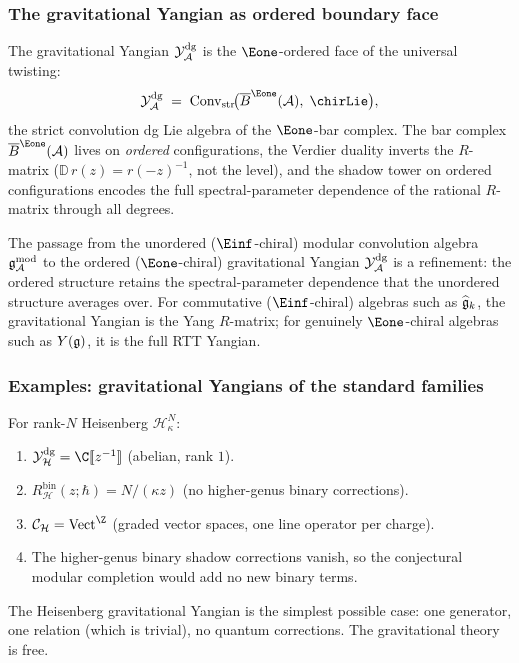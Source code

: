 \subsubsection{The gravitational Yangian as ordered boundary face}

\begin{remark}
\label{rem:thqg-V-ordered-face}
The gravitational Yangian $\mathcal{Y}^{\mathrm{dg}}_{\mathcal{A}}$ is the $\Eone$-ordered face of
the universal twisting:
\begin{equation}\label{eq:thqg-V-ordered-face}
\Ydg_\cA
\;=\;
\Convstr\!\bigl(\barB^{\Eone}(\cA),\;\chirLie\bigr),
\end{equation}
the strict convolution dg Lie algebra of the $\Eone$-bar complex.
The bar complex $\barB^{\Eone}(\cA)$ lives on \emph{ordered}
configurations, the Verdier duality inverts the $R$-matrix
($\mathbb{D}\,r(z) = r(-z)^{-1}$, not the level), and the shadow
tower on ordered configurations encodes the full spectral-parameter
dependence of the rational $R$-matrix through all degrees.

The passage from the unordered ($\Einf$-chiral) modular
convolution algebra $\mathfrak{g}_{\mathcal{A}}^{\mathrm{mod}}$ to the ordered ($\Eone$-chiral)
gravitational Yangian $\mathcal{Y}^{\mathrm{dg}}_{\mathcal{A}}$ is a refinement: the ordered
structure retains the spectral-parameter dependence that the
unordered structure averages over. For
commutative ($\Einf$-chiral) algebras such as $\widehat{\mathfrak{g}}_k$,
the gravitational Yangian is the Yang $R$-matrix; for genuinely
$\Eone$-chiral algebras such as $Y(\mathfrak{g})$, it is the full RTT
Yangian.
\end{remark}


\subsubsection{Examples: gravitational Yangians of the standard families}

\begin{computation}
\label{comp:thqg-V-heis-yangian}
For rank-$N$ Heisenberg $\mathcal{H}^N_\kappa$:
\begin{enumerate}[label=\textup{(\roman*)}]
\item $\Ydg_{\mathcal{H}} = \C[\![z^{-1}]\!]$
 (abelian, rank $1$).
\item $R^{\mathrm{bin}}_{\mathcal{H}}(z;\hbar) = N/(\kappa z)$
 (no higher-genus binary corrections).
\item $\cC_{\mathcal{H}} = \mathrm{Vect}^{\Z}$ (graded vector
 spaces, one line operator per charge).
\item The higher-genus binary shadow corrections vanish, so the
 conjectural modular completion would add no new binary terms.
\end{enumerate}
The Heisenberg gravitational Yangian is the simplest possible
case: one generator, one relation (which is trivial), no quantum
corrections. The gravitational theory is free.
\end{computation}

